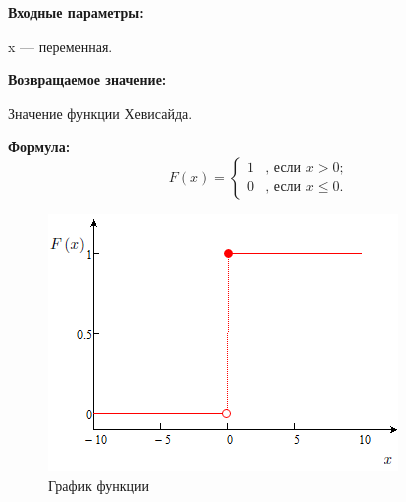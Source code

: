 \textbf{Входные параметры:}

 x --- переменная.

\textbf{Возвращаемое значение:}
 
 Значение функции Хевисайда.
 
\textbf{Формула:}
\begin{equation*}
F\left(x \right)=\left\lbrace \begin{aligned}
1&\text{, если } x>0; \\
0&\text{, если } x\leq 0.
\end{aligned}\right. 
\end{equation*}

 \begin{figure} [h] 
   \center
   \includegraphics {TMHL_HeavisideFunction_Graph.png}
   \caption{График функции} 
   \label{img:TMHL_HeavisideFunction_Graph}  
 \end{figure}
 
